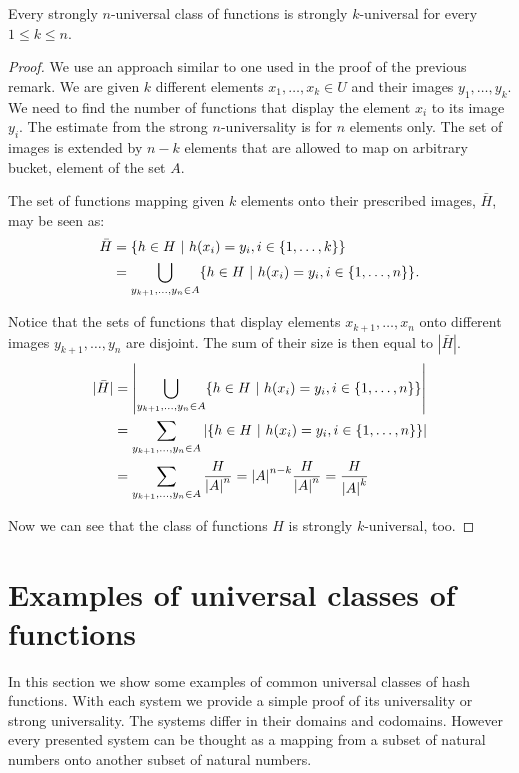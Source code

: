 \begin{remark}
Every strongly $n$-universal class of functions is strongly $k$-universal for every $1 \leq k \leq n$.
\end{remark}
\begin{proof}
We use an approach similar to one used in the proof of the previous remark. We are given $k$ different elements $x_1, \dots, x_k \in U$ and their images $y_1, \dots, y_k$. We need to find the number of functions that display the element $x_i$ to its image $y_i$. The estimate from the strong $n$-universality is for $n$ elements only. The set of images is extended by $n - k$ elements that are allowed to map on arbitrary bucket, element of the set $A$.

The set of functions mapping given $k$ elements onto their prescribed images, $\bar H$,  may be seen as:
\[
\begin{split}
\bar{H}	& = \lbrace h \in H \ | \  h(x_i) = y_i, i \in \lbrace 1, \dots, k \rbrace \rbrace \\
	& = \displaystyle \bigcup_{y_{k+1}, \dots, y_n \in A} \lbrace h \in H \ | \  h(x_i) = y_i, i \in \lbrace 1, \dots, n \rbrace \rbrace \textit{.}
\end{split}
\]

Notice that the sets of functions that display elements $x_{k + 1}, \dots, x_n$ onto different images $y_{k + 1}, \dots, y_n$ are disjoint. The sum of their size is then equal to $|\bar H|$.
\[
\begin{split}
|\bar H|& = \left| \displaystyle \bigcup_{y_{k+1}, \dots, y_n \in A} \lbrace h \in H \ | \  h(x_i) = y_i, i \in \lbrace 1, \dots, n \rbrace \rbrace \right| \\
	& = \displaystyle \sum_{y_{k+1}, \dots, y_n \in A} \left| \lbrace h \in H \ | \  h(x_i) = y_i, i \in \lbrace 1, \dots, n \rbrace \rbrace \right| \\
	& = \displaystyle \sum_{y_{k+1}, \dots, y_n \in A} \frac{H}{{|A|}^{n}} = {|A|}^{n - k} \frac{H}{{|A|}^{n}} = \frac{H}{{|A|}^{k}}
\end{split}
\]

Now we can see that the class of functions $H$ is strongly $k$-universal, too.
\end{proof}

\section{Examples of universal classes of functions}
In this section we show some examples of common universal classes of hash functions. With each system we provide a simple proof of its universality or strong universality. The systems differ in their domains and codomains. However every presented system can be thought as a mapping from a subset of natural numbers onto another subset of natural numbers.

